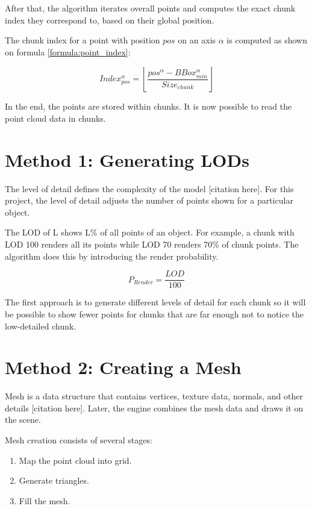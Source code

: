After that, the algorithm iterates overall points and computes the exact chunk index they correspond to, based on their global position.

The chunk index for a point with position $pos$ on an axis $\alpha$ is computed as shown on formula \ref{formula:point_index}:

\begin{equation}
\label{formula:point_index}
Index_{pos}^\alpha = \left \lfloor \frac{pos^{\alpha} - BBox_{min}^\alpha}{Size_{chunk}} \right \rfloor
\end{equation}

In the end, the points are stored within chunks. It is now possible to read the point cloud data in chunks.


\section{Method 1: Generating LODs}
\label{sec:generating_lods}

The level of detail defines the complexity of the model [citation here]. For this project, the level of detail adjusts the number of points shown for a particular object.

The LOD of L shows L\% of all points of an object. For example, a chunk with LOD 100 renders all its points while LOD 70 renders 70\% of chunk points. The algorithm does this by introducing the render probability.

\begin{equation}
\label{formula:render_probability}
P_{Render} = \frac{LOD}{100}
\end{equation}

The first approach is to generate different levels of detail for each chunk so it will be possible to show fewer points for chunks that are far enough not to notice the low-detailed chunk.

\newpage

\section{Method 2: Creating a Mesh}
\label{sec:creating_mesh}

Mesh is a data structure that contains vertices, texture data, normals, and other details [citation here]. Later, the engine  combines the mesh data and draws it on the scene.

Mesh creation consists of several stages:

\begin{enumerate}
    \item Map the point cloud into grid.
    \item Generate triangles.
    \item Fill the mesh.
\end{enumerate}


